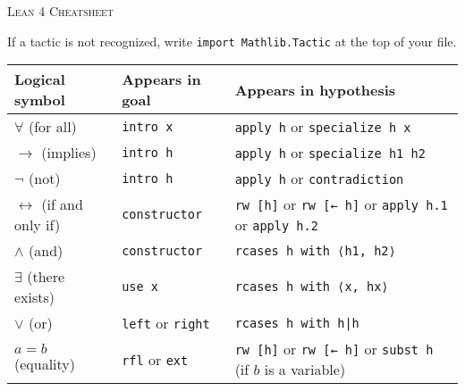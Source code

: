 \documentclass[a4paper]{article}
\newcommand{\lean}[1]{{\tt #1}}
\newcommand{\nv}{\textit{new\_name}\xspace}
\newcommand{\nom}{\textit{name}\xspace}
\newcommand{\expr}{\textit{expr}\xspace}
\begin{document}
\pagestyle{empty}
\begin{center}
 \large\textsc{Lean 4 Cheatsheet}
\end{center}


\begin{center}
If a tactic is not recognized, write \lean{import Mathlib.Tactic} at the top of your file.\smallskip
\setlength\tabcolsep{5mm}
\def\arraystretch{1.3}
\begin{tabular}{@{}lll@{}}
  \toprule
  Logical symbol & Appears in goal & Appears in hypothesis \\
  \midrule
  $\forall$ (for all) & \lean{intro x} & \lean{apply h} or \lean{specialize h x}  \\
  $\to$ (implies) & \lean{intro h} & \lean{apply h} or \lean{specialize h1 h2} \\
  $\neg$ (not) & \lean{intro h} & \lean{apply h} or \lean{contradiction}  \\
  $\leftrightarrow$ (if and only if)\qquad & \lean{constructor}  & \lean{rw [h]} or \lean{rw [← h]} or \lean{apply h.1} or \lean{apply h.2}\\
  $\wedge$ (and) & \lean{constructor} & \lean{rcases h with ⟨h1, h2⟩} \\
  $\exists$ (there exists) & \lean{use x} & \lean{rcases h with ⟨x, hx⟩} \\
  $\vee$ (or) & \lean{left} or \lean{right} & \lean{rcases h with h|h} \\
  $ a = b$ (equality) & \lean{rfl} or \lean{ext} & \lean{rw [h]} or \lean{rw [← h]} or \lean{subst h} (if $b$ is a variable) \\
\bottomrule
\end{tabular}
\end{center}
\end{document}
